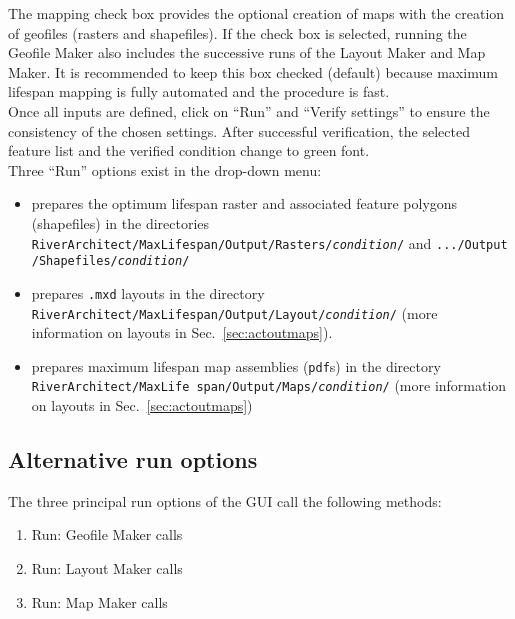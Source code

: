 The mapping check box provides the optional creation of maps with the creation of geofiles (rasters and shapefiles). If the check box is selected, running the Geofile Maker also includes the successive runs of the Layout Maker and Map Maker. It is recommended to keep this box checked (default) because maximum lifespan mapping is fully automated and the procedure is fast.\\

Once all inputs are defined, click on ``Run'' and ``Verify settings'' to ensure the consistency of the chosen settings. After successful verification, the selected feature list and the verified condition change to green font.\\

Three ``Run'' options exist in the drop-down menu:
\begin{itemize}
\item {} prepares the optimum lifespan raster and associated feature polygons (shapefiles) in the directories \texttt{RiverArchitect/MaxLifespan/Output/Rasters/\textit{condition}/} and \texttt{.../Output /Shapefiles/\textit{condition}/}
\item {} prepares \texttt{.mxd} layouts in the directory \texttt{RiverArchitect/MaxLifespan/Output/Layout/\textit{condition}/} (more information on layouts in Sec.~\ref{sec:actoutmaps}).
\item {} prepares maximum lifespan map assemblies (\texttt{pdf}s) in the directory \texttt{RiverArchitect/MaxLife span/Output/Maps/\textit{condition}/} (more information on layouts in Sec.~\ref{sec:actoutmaps})
\end{itemize}



\subsection{Alternative run options}
\label{sec:actrun}
The three principal run options of the GUI call the following methods:
\begin{enumerate}
\item Run: Geofile Maker calls  
\item Run: Layout Maker calls  
\item Run: Map Maker calls  
\end{enumerate}

